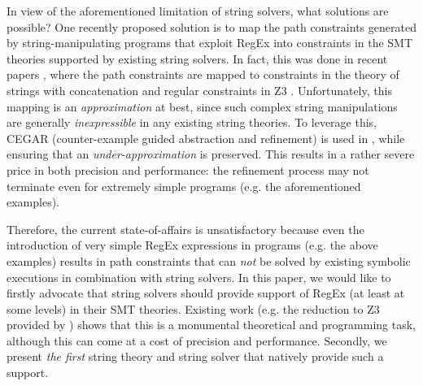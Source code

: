 In view of the aforementioned limitation of string solvers, what solutions are
possible? One recently proposed solution is to map the path constraints
generated by string-manipulating programs that exploit RegEx into constraints
in the SMT theories
supported by existing string solvers. In fact, this was done in recent papers
\cite{aratha,LMK19}, where the path constraints are mapped to constraints
in the theory of strings with concatenation and regular constraints in Z3 
\cite{Z3}. Unfortunately, this mapping is an \emph{approximation} at best, since
such complex string manipulations are generally \emph{inexpressible} in any 
existing string theories. To leverage this, CEGAR (counter-example guided 
abstraction and refinement) is used in \cite{LMK19}, while ensuring that an
\emph{under-approximation} is preserved. 
This results in a rather severe price in both precision and performance: the
refinement process may not terminate even for extremely simple programs
(e.g. the aforementioned examples). 

Therefore, the current state-of-affairs is unsatisfactory because even 
the introduction of very simple RegEx expressions in programs (e.g. the above 
examples) results in path constraints that can \emph{not} be solved by existing 
symbolic executions in combination with string solvers. In this paper, we would
like to firstly advocate that string solvers should provide support of RegEx 
(at least at some levels) in their SMT theories. Existing work
(e.g. the reduction to Z3 provided by \cite{LMK19}) shows that this is a 
monumental theoretical and programming task, although this can come at a 
cost of precision and performance. Secondly, we present \emph{the first} string
theory and string solver that natively provide such a support.


